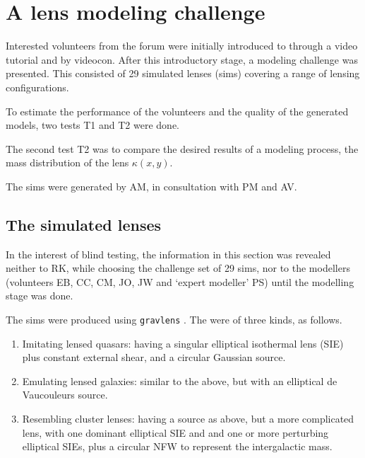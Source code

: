 \section{A lens modeling challenge} \label{sec:mod_challenge}


Interested volunteers from the \sw forum were initially introduced to
\spl through a video tutorial and by videocon.  After this
introductory stage, a modeling challenge was presented.  This
consisted of 29 simulated lenses (sims) covering a range of lensing
configurations.

To estimate the performance of the volunteers and the quality of the generated models, two tests T1 and T2 were done.

The second test T2 was to compare the desired results of a modeling process, the mass distribution of the lens $\kappa(x, y)$.

The \sw sims were generated by AM, in consultation with PM and AV.


\subsection{The simulated lenses} \label{sec:sims}

In the interest of blind testing, the information in this section was
revealed neither to RK, while choosing the challenge set of 29 sims,
nor to the modellers (volunteers EB, CC, CM, JO, JW and `expert
modeller' PS) until the modelling stage was done.

The sims were produced using {\tt gravlens}
\citep{2001astro.ph..2341K,2001astro.ph..2340K}.  The were of three
kinds, as follows.

\begin{enumerate}
  \item Imitating lensed quasars: having a singular elliptical
    isothermal lens (SIE) plus constant external shear, and a circular
    Gaussian source.
  \item Emulating lensed galaxies: similar to the above, but with an
    elliptical de Vaucouleurs source.
  \item Resembling cluster lenses: having a source as above, but a
    more complicated lens, with one dominant elliptical SIE and and
    one or more perturbing elliptical SIEs, plus a circular NFW
    \citep{1996ApJ...462..563N,1997ApJ...490..493N} to represent
    the intergalactic mass.
\end{enumerate}

